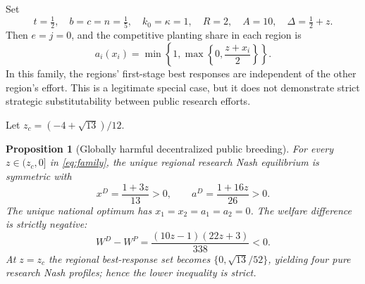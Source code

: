 \documentclass[11pt]{article}
\newtheorem{proposition}{Proposition}
\begin{document}
Set
\begin{equation}
 t=\tfrac12,\quad b=c=n=\tfrac15,\quad
 k_0=\kappa=1,\quad R=2,\quad A=10,\quad
 \Delta=\tfrac12+z.
 \label{eq:family}
\end{equation}
Then $e=j=0$, and the competitive planting share in each region is
\begin{equation}
 a_i(x_i)=\min\left\{1,\max\left\{0,\frac{z+x_i}{2}\right\}\right\}.
 \label{eq:clamp}
\end{equation}
In this family, the regions' first-stage best responses are independent of the other region's effort. This is a legitimate special case, but it does not demonstrate strict strategic substitutability between public research efforts.

Let $z_c=(-4+\sqrt{13})/12$.

\begin{proposition}[Globally harmful decentralized public breeding]
For every $z\in(z_c,0]$ in \eqref{eq:family}, the unique regional research Nash equilibrium is symmetric with
\begin{equation}
 x^D=\frac{1+3z}{13}>0,\qquad
 a^D=\frac{1+16z}{26}>0.
 \label{eq:p3nash}
\end{equation}
The unique national optimum has $x_1=x_2=a_1=a_2=0$. The welfare difference is strictly negative:
\begin{equation}
 W^D-W^P=\frac{(10z-1)(22z+3)}{338}<0.
 \label{eq:p3loss}
\end{equation}
At $z=z_c$ the regional best-response set becomes $\{0,\sqrt{13}/52\}$, yielding four pure research Nash profiles; hence the lower inequality is strict.
\end{proposition}
\end{document}
